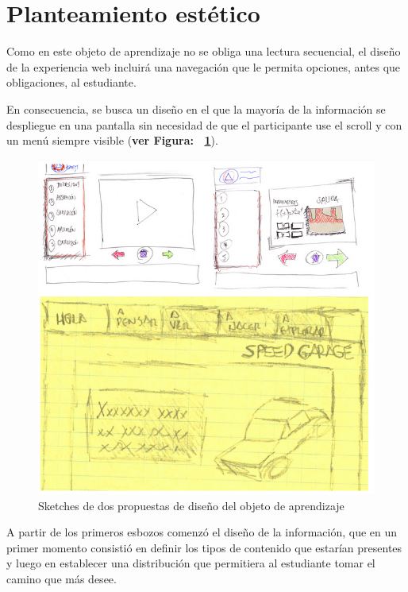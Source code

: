 \documentclass[twoside,letterpaper,11pt]{report}
\begin{document}

\section{Planteamiento estético} %
\label{sec:planteamiento_est_tico}

Como en este objeto de aprendizaje no se obliga una lectura secuencial, el diseño de la experiencia web incluirá una navegación que le permita opciones, antes que obligaciones, al estudiante.

En consecuencia, se busca un diseño en el que la mayoría de la información se despliegue en una pantalla sin necesidad de que el participante use el scroll y con un menú siempre visible (\textbf{ver Figura: ~\ref{sketches}}).

\begin{figure}[h!]
\label{sketches}
\includegraphics[width=1\textwidth]{aux/sketches}
\caption{Sketches de dos propuestas de diseño del objeto de aprendizaje}
\end{figure}


A partir de los primeros esbozos comenzó el diseño de la información, que en un primer momento consistió en definir los tipos de contenido que estarían presentes y luego en establecer una distribución que permitiera al estudiante tomar el camino que más desee.
\end{document}
